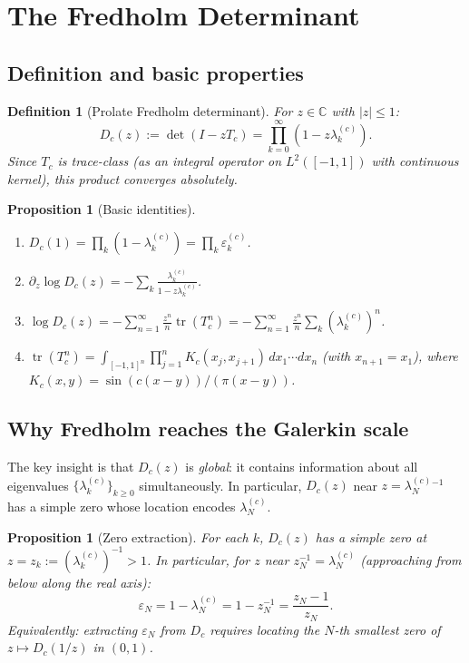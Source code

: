 \documentclass[12pt,a4paper]{article}
\newtheorem{proposition}[theorem]{Proposition}
\newtheorem{definition}[theorem]{Definition}
\newcommand{\lam}[1]{\lambda_{#1}^{(c)}}
\newcommand{\eps}[1]{\varepsilon_{#1}^{(c)}}
\newcommand{\Tc}{T_c}
\newcommand{\Dc}{D_c}
\begin{document}
\section{The Fredholm Determinant}
\label{sec:fredholm}

\subsection{Definition and basic properties}

\begin{definition}[Prolate Fredholm determinant]
For $z \in \mathbb{C}$ with $|z| \leq 1$:
\[
  \Dc(z) := \det(I - z\Tc)
  = \prod_{k=0}^{\infty} (1 - z\lam{k}).
\]
Since $\Tc$ is trace-class (as an integral operator
on $L^2([-1,1])$ with continuous kernel),
this product converges absolutely.
\end{definition}

\begin{proposition}[Basic identities]
\label{prop:fredholm_basic}
\begin{enumerate}[nosep]
  \item $\Dc(1) = \prod_k (1 - \lam{k}) = \prod_k \eps{k}$.
  \item $\partial_z \log \Dc(z) = -\sum_k \frac{\lam{k}}{1-z\lam{k}}$.
  \item $\log \Dc(z) = -\sum_{n=1}^{\infty}
        \frac{z^n}{n}\operatorname{tr}(\Tc^n)
        = -\sum_{n=1}^{\infty} \frac{z^n}{n}
        \sum_k (\lam{k})^n$.
  \item $\operatorname{tr}(\Tc^n)
        = \int_{[-1,1]^n}
        \prod_{j=1}^n K_c(x_j, x_{j+1})\,
        dx_1\cdots dx_n$
        (with $x_{n+1} = x_1$),
        where $K_c(x,y) = \sin(c(x-y))/(\pi(x-y))$.
\end{enumerate}
\end{proposition}

\subsection{Why Fredholm reaches the Galerkin scale}

The key insight is that $\Dc(z)$ is \emph{global}:
it contains information about all eigenvalues
$\{\lam{k}\}_{k \geq 0}$ simultaneously.
In particular, $\Dc(z)$ near $z = \lam{N}^{-1}$
has a simple zero whose location encodes $\lam{N}$.

\begin{proposition}[Zero extraction]
\label{prop:zero}
For each $k$, $\Dc(z)$ has a simple zero at
$z = z_k := (\lam{k})^{-1} > 1$.
In particular, for $z$ near $z_N^{-1} = \lam{N}$
(approaching from below along the real axis):
\[
  \varepsilon_N = 1 - \lam{N}
  = 1 - z_N^{-1}
  = \frac{z_N - 1}{z_N}.
\]
\noindent
Equivalently: extracting $\varepsilon_N$ from $\Dc$
requires locating the $N$-th \emph{smallest zero}
of $z \mapsto \Dc(1/z)$ in $(0,1)$.
\end{proposition}
\end{document}
